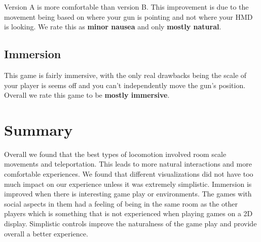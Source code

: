 \documentclass[journal]{IEEEtran}
\begin{document}
Version A is more comfortable than version B. This improvement is due to the movement being based on where your gun is pointing and not where your HMD is looking. We rate this as \textbf{minor nausea} and only \textbf{mostly natural}.

\subsection{Immersion}
This game is fairly immersive, with the only real drawbacks being the scale of your player is seems off and you can't independently move the gun's position. Overall we rate this game to be \textbf{mostly immersive}.



\section{Summary}
Overall we found that the best types of locomotion involved room scale movements and teleportation. This leads to more natural interactions and more comfortable experiences. We found that different visualizations did not have too much impact on our experience unless it was extremely simplistic. Immersion is improved when there is interesting game play or environments. The games with social aspects in them had a feeling of being in the same room as the other players which is something that is not experienced when playing games on a 2D display. Simplistic controls improve the naturalness of the game play and provide overall a better experience. 
\end{document}
